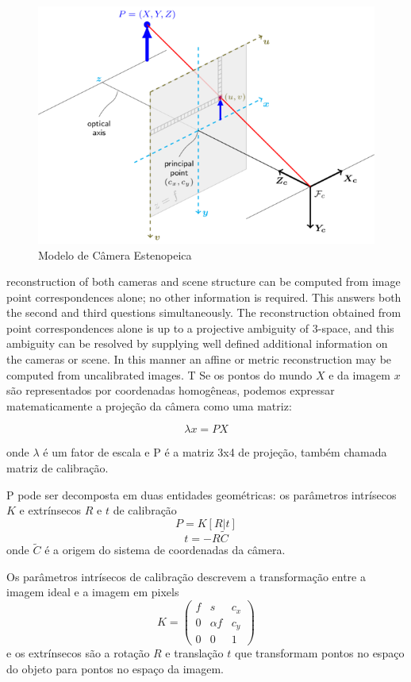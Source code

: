 \documentclass[conference]{IEEEtran}
\begin{document}
\begin{figure}[ht!]
\begin{center}
\includegraphics[width=.75\columnwidth]{pinhole.png}
\caption{Modelo de Câmera Estenopeica\cite{docsopencv}}
\end{center}
\end{figure}
reconstruction of both cameras and scene structure can be computed from image point correspondences alone; no other information is required. This answers both the second and third questions simultaneously. The reconstruction obtained from point correspondences alone is up to a projective ambiguity of 3-space, and this ambiguity can be resolved by supplying well defined additional information on the cameras or scene. In this manner an affine or metric reconstruction may be computed from uncalibrated images. T
Se os pontos do mundo \(X\) e da imagem \(x\) são representados por coordenadas homogêneas, podemos expressar matematicamente a projeção da câmera como uma matriz\cite{tese}:

\begin{equation}\lambda  x = P  X\label{eq:P_X}\end{equation}

onde \(\lambda\) é um fator de escala e P é a matriz 3x4 de projeção, também chamada matriz de calibração.

P pode ser decomposta em duas entidades geométricas: os parâmetros intrísecos \(K\) e extrínsecos \(R\) e \(t\) de calibração\cite{tese}
\begin{equation}
P = K [R | t]
\end{equation}
\begin{equation}
t = -R\widetilde{C}
\end{equation}
onde \(\widetilde{C}\) é a origem do sistema de coordenadas da câmera\cite{Hartley2004}.

Os parâmetros intrísecos de calibração descrevem a transformação entre a imagem ideal e a imagem em pixels
\begin{equation}
K = \begin{pmatrix} 
f & s & c_x \\
0 & \alpha f & c_y\\
0 & 0 & 1
\end{pmatrix}
\end{equation}
e os extrínsecos são a rotação \(R\) e translação \(t\) que transformam pontos no espaço do objeto para pontos no espaço da imagem\cite{tese}.
\end{document}
